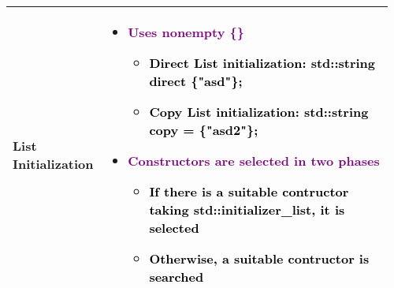 \documentclass[main.tex,fontsize=8pt,paper=a4,paper=portrait,DIV=calc]{scrartcl}
\begin{document}
\begin{table}[ht!]
\begin{tabular}{|m{0.2\linewidth}|m{0.755\linewidth}|}
\hline
List Initialization & 
\vspace{2mm}
\begin{itemize}
  \item \textcolor{purple}{Uses nonempty \{\}}
    \begin{itemize}
      \item \textcolor{black}{Direct List initialization: std::string direct \{"asd"\};}
      \item \textcolor{black}{Copy List initialization: std::string copy = \{"asd2"\};}
    \end{itemize} 
\item \textcolor{purple}{Constructors are selected in two phases}
  \begin{itemize}
  \item \textcolor{black}{If there is a suitable contructor taking std::initializer\_list, it is selected}
  \item \textcolor{black}{Otherwise, a suitable contructor is searched}
  \end{itemize} 
\vspace{-3mm}
\end{itemize} 
\\
\hline
\end{tabular}
\end{table}
\pagebreak
\end{document}
